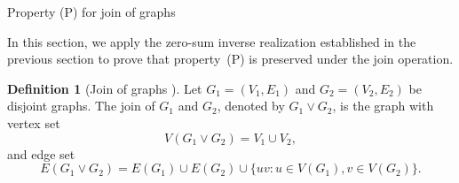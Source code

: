 \documentclass[12pt,reqno]{amsart}
\makeatletter
\theoremstyle{definition}
\newtheorem{defn}[thm]{Definition}
\numberwithin{equation}{subsection}
\numberwithin{equation}{section}
\def\section{\def\@secnumfont{\mdseries}\@startsection{section}{1}%
  \z@{.7\linespacing\@plus\linespacing}{.5\linespacing}%
  {\normalfont\scshape\centering}}
\makeatother
\begin{document}
 \section{Property (P) for join of graphs}\label{sec:join}
 
In this section, we apply the zero-sum inverse realization established in the previous section to prove that property~(P) is preserved under the join operation.

\begin{defn}[Join of graphs {\cite[Definition~3.3.6]{west}}]
    Let $G_1=(V_1,E_1)$ and $G_2=(V_2,E_2)$ be disjoint graphs. The join of $G_1$ and $G_2$, denoted by $G_1 \vee G_2$, is the graph with vertex set
    \[ 
    V(G_1 \vee G_2)= V_1 \cup V_2, \]
   and edge set
    \[
    E(G_1 \vee G_2)= E(G_1) \cup E(G_2) \cup \bigl\{uv: u \in V(G_1), v \in V(G_2)\bigr\}. 
    \]
\end{defn}
\end{document}
